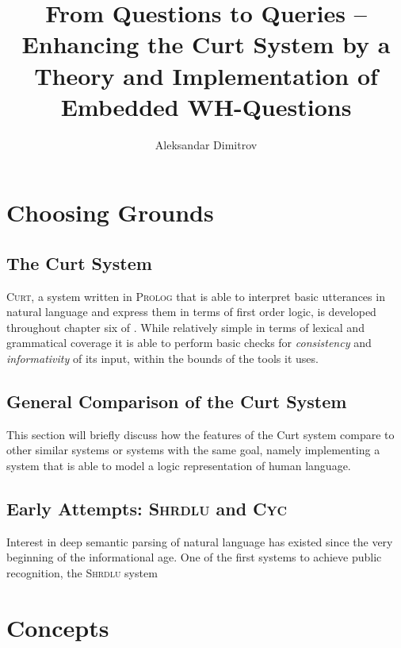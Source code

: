 \documentclass{scrartcl}
\author{Aleksandar Dimitrov}
\title{From Questions to Queries -- Enhancing the Curt System by a Theory and Implementation of Embedded WH-Questions}
\newcommand{\pn}{\textsc}
\newcommand{\prol}{\pn{Prolog} }
\begin{document}
\maketitle
\tableofcontents

\section{Choosing Grounds} %

\subsection{The Curt System}

\pn{Curt}, a system written in \prol that is able to interpret basic utterances
in natural language and express them in terms of first order logic, is developed
throughout chapter six of \cite{blackburnbos:cl1}. While relatively simple in
terms of lexical and grammatical coverage it is able to perform basic checks for 
\emph{consistency} and \emph{informativity} of its input\footnotemark, within
the bounds of the tools it uses.

\subsection{General Comparison of the Curt System}

This section will briefly discuss how the features of the Curt system compare to
other similar systems or systems with the same goal, namely implementing a
system that is able to model a logic representation of human language.

\subsection{Early Attempts: \pn{Shrdlu} and \pn{Cyc}}

Interest in deep semantic parsing of natural language has existed since the very
beginning of the informational age. One of the first systems to achieve public
recognition, the \pn{Shrdlu} system 


\section{Concepts}
\end{document}
